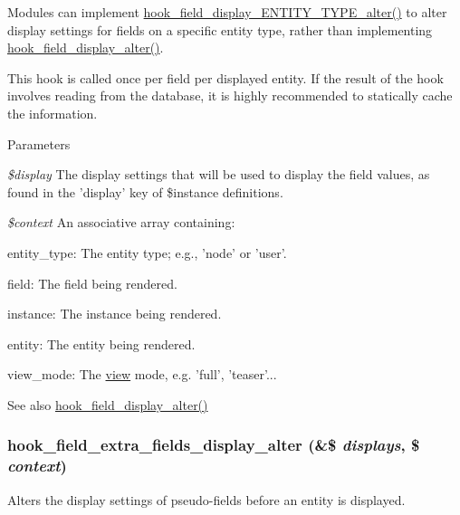 Modules can implement \hyperlink{group__field__storage_gadc76e94183dbbeebe237c70be5ca1e96}{hook\_\-field\_\-display\_\-ENTITY\_\-TYPE\_\-alter()} to alter display settings for fields on a specific entity type, rather than implementing \hyperlink{group__field__storage_ga7a5d4e018902a0072d5de819bbc7c409}{hook\_\-field\_\-display\_\-alter()}.

This hook is called once per field per displayed entity. If the result of the hook involves reading from the database, it is highly recommended to statically cache the information.


\begin{DoxyParams}{Parameters}
\item[{\em \$display}]The display settings that will be used to display the field values, as found in the 'display' key of \$instance definitions. \item[{\em \$context}]An associative array containing:
\begin{DoxyItemize}
\item entity\_\-type: The entity type; e.g., 'node' or 'user'.
\item field: The field being rendered.
\item instance: The instance being rendered.
\item entity: The entity being rendered.
\item view\_\-mode: The \hyperlink{classview}{view} mode, e.g. 'full', 'teaser'...
\end{DoxyItemize}\end{DoxyParams}
\begin{DoxySeeAlso}{See also}
\hyperlink{group__field__storage_ga7a5d4e018902a0072d5de819bbc7c409}{hook\_\-field\_\-display\_\-alter()} 
\end{DoxySeeAlso}
\hypertarget{group__field__storage_ga351523fbe5df740a16257a35f2daa335}{
\subsubsection[{hook\_\-field\_\-extra\_\-fields\_\-display\_\-alter}]{\setlength{\rightskip}{0pt plus 5cm}hook\_\-field\_\-extra\_\-fields\_\-display\_\-alter (\&\$ {\em displays}, \/  \$ {\em context})}}
\label{group__field__storage_ga351523fbe5df740a16257a35f2daa335}
Alters the display settings of pseudo-\/fields before an entity is displayed.


